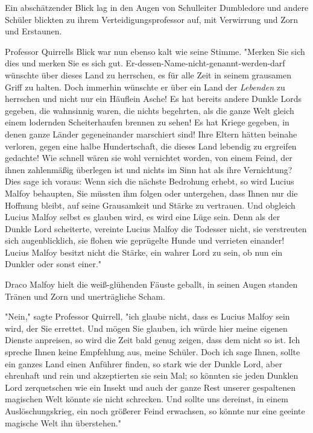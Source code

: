 {Ein abschätzender Blick lag in den Augen von Schulleiter Dumbledore und andere Schüler blickten zu ihrem Verteidigungsprofessor auf, mit Verwirrung und Zorn und Erstaunen.

Professor Quirrells Blick war nun ebenso kalt wie seine Stimme. "Merken Sie sich dies und merken Sie es sich gut. Er-dessen-Name-nicht-genannt-werden-darf wünschte über dieses Land zu herrschen, es für alle Zeit in seinem grausamen Griff zu halten. Doch immerhin wünschte er über ein Land der \emph{Lebenden} zu herrschen und nicht nur ein Häuflein Asche! Es hat bereits andere Dunkle Lords gegeben, die wahnsinnig waren, die nichts begehrten, als die ganze Welt gleich einem lodernden Scheiterhaufen brennen zu sehen! Es hat Kriege gegeben, in denen ganze Länder gegeneinander marschiert sind! Ihre Eltern hätten beinahe verloren, gegen eine halbe Hundertschaft, die dieses Land lebendig zu ergreifen gedachte! Wie schnell wären sie wohl vernichtet worden, von einem Feind, der ihnen zahlenmäßig überlegen ist und nichts im Sinn hat als ihre Vernichtung? Dies sage ich voraus: Wenn sich die nächste Bedrohung erhebt, so wird Lucius Malfoy behaupten, Sie müssten ihm folgen oder untergehen, dass Ihnen nur die Hoffnung bleibt, auf seine Grausamkeit und Stärke zu vertrauen. Und obgleich Lucius Malfoy selbst es glauben wird, es wird eine Lüge sein. Denn als der Dunkle Lord scheiterte, vereinte Lucius Malfoy die Todesser nicht, sie verstreuten sich augenblicklich, sie flohen wie geprügelte Hunde und verrieten einander! Lucius Malfoy besitzt nicht die Stärke, ein wahrer Lord zu sein, ob nun ein Dunkler oder sonst einer."

Draco Malfoy hielt die weiß-glühenden Fäuste geballt, in seinen Augen standen Tränen und Zorn und unerträgliche Scham.

"Nein," sagte Professor Quirrell, "ich glaube nicht, dass es Lucius Malfoy sein wird, der Sie errettet. Und mögen Sie glauben, ich würde hier meine eigenen Dienste anpreisen, so wird die Zeit bald genug zeigen, dass dem nicht so ist. Ich spreche Ihnen keine Empfehlung aus, meine Schüler. Doch ich sage Ihnen, sollte ein ganzes Land einen Anführer finden, so stark wie der Dunkle Lord, aber ehrenhaft und rein und akzeptierten sie sein Mal; so könnten sie jeden Dunklen Lord zerquetschen wie ein Insekt und auch der ganze Rest unserer gespaltenen magischen Welt könnte sie nicht schrecken. Und sollte uns dereinst, in einem Auslöschungskrieg, ein noch größerer Feind erwachsen, so könnte nur eine geeinte magische Welt ihn überstehen."

}
